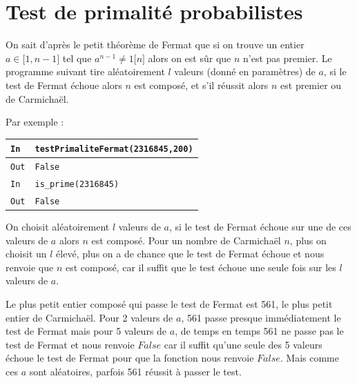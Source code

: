 \documentclass[titlepage]{article}
\begin{document}
    \section{Test de primalité probabilistes}
    On sait d'après le petit théorème de Fermat que si on trouve un entier $a \in \lbrack1,n-1\rbrack$
    tel que $a^{n-1} \neq 1 \lbrack n \rbrack$ alors on est sûr que $n$ n'est pas premier. 
    Le programme suivant tire aléatoirement $l$ valeurs (donné en paramètres) de $a$, 
    si le test de Fermat échoue alors $n$ est composé, et s'il réussit alors $n$ est premier ou de Carmichaël.

    

    Par exemple : \bigbreak

    \begin{tabularx}{12cm}{|p{0.60cm}|X|}
        \hline
        \rowcolor{gray}
        \texttt{In}
        & 
        \texttt{testPrimaliteFermat(2316845,200)}
        \\
        \hline
        \texttt{Out}
        &
        \texttt{False}
        \\
        \hline
        \rowcolor{gray}
        \texttt{In}
        & 
        \texttt{is\_prime(2316845)}
        \\
        \hline
        \texttt{Out}
        &
        \texttt{False}
        \\
        \hline
    \end{tabularx}
    \bigbreak

    On choisit aléatoirement $l$ valeurs de $a$, si le test de Fermat échoue sur une de ces valeurs de $a$ alors
    $n$ est composé. Pour un nombre de Carmichaël $n$, plus on choisit un $l$ élevé, plus on a de chance que le test
    de Fermat échoue et nous renvoie que $n$ est composé, car il suffit que le test échoue une seule fois sur les $l$ 
    valeurs de $a$. \bigbreak

    Le plus petit entier composé qui passe le test de Fermat est 561, le plus petit entier de Carmichaël.
    Pour 2 valeurs de $a$, 561 passe presque immédiatement le test de Fermat mais pour 5 valeurs de $a$, 
    de temps en temps 561 ne passe pas le test de Fermat et nous renvoie $False$ car il suffit qu'une seule
    des 5 valeurs échoue le test de Fermat pour que la fonction nous renvoie $False$. Mais comme ces $a$
    sont aléatoires, parfois 561 réussit à passer le test.\newline
\end{document}
